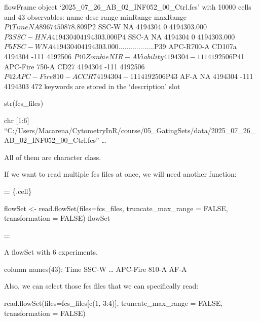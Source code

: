 \documentclass[
  letterpaper,
  DIV=11,
  numbers=noendperiod]{scrartcl}
\newenvironment{Shaded}{\begin{snugshade}}{\end{snugshade}}
\newcommand{\AttributeTok}[1]{\textcolor[rgb]{0.40,0.45,0.13}{#1}}
\newcommand{\ConstantTok}[1]{\textcolor[rgb]{0.56,0.35,0.01}{#1}}
\newcommand{\DecValTok}[1]{\textcolor[rgb]{0.68,0.00,0.00}{#1}}
\newcommand{\FunctionTok}[1]{\textcolor[rgb]{0.28,0.35,0.67}{#1}}
\newcommand{\NormalTok}[1]{\textcolor[rgb]{0.00,0.23,0.31}{#1}}
\newcommand{\OtherTok}[1]{\textcolor[rgb]{0.00,0.23,0.31}{#1}}
\newcommand{\SpecialCharTok}[1]{\textcolor[rgb]{0.37,0.37,0.37}{#1}}
\begin{document}
flowFrame object `2025\_07\_26\_AB\_02\_INF052\_00\_Ctrl.fcs' with 10000
cells and 43 observables: name desc range minRange maxRange
\(P1            Time        NA    896745         0     878.809\)P2 SSC-W
NA 4194304 0 4194303.000
\(P3           SSC-H        NA   4194304         0 4194303.000\)P4 SSC-A
NA 4194304 0 4194303.000
\(P5           FSC-W        NA   4194304         0 4194303.000
...             ...       ...       ...       ...         ...\)P39
APC-R700-A CD107a 4194304 -111 4192506
\(P40   Zombie NIR-A Viability   4194304      -111     4192506\)P41
APC-Fire 750-A CD27 4194304 -111 4192506
\(P42 APC-Fire 810-A      CCR7   4194304      -111     4192506\)P43 AF-A
NA 4194304 -111 4194303 472 keywords are stored in the `description'
slot

\begin{Shaded}
\begin{Highlighting}[]
\FunctionTok{str}\NormalTok{(fcs\_files)}
\end{Highlighting}
\end{Shaded}

chr {[}1:6{]}
``C:/Users/Macarena/CytometryInR/course/05\_GatingSets/data/2025\_07\_26\_AB\_02\_INF052\_00\_Ctrl.fcs''
\ldots{}

All of them are character class.

If we want to read multiple fcs files at once, we will need another
function:

::: \{.cell\}

\begin{Shaded}
\begin{Highlighting}[]
\NormalTok{flowSet }\OtherTok{\textless{}{-}} \FunctionTok{read.flowSet}\NormalTok{(}\AttributeTok{files=}\NormalTok{fcs\_files, }\AttributeTok{truncate\_max\_range =} \ConstantTok{FALSE}\NormalTok{, }\AttributeTok{transformation =} \ConstantTok{FALSE}\NormalTok{)}
\NormalTok{flowSet}
\end{Highlighting}
\end{Shaded}

:::

A flowSet with 6 experiments.

column names(43): Time SSC-W \ldots{} APC-Fire 810-A AF-A

Also, we can select those fcs files that we can specifically read:

\begin{Shaded}
\begin{Highlighting}[]
\FunctionTok{read.flowSet}\NormalTok{(}\AttributeTok{files=}\NormalTok{fcs\_files[}\FunctionTok{c}\NormalTok{(}\DecValTok{1}\NormalTok{, }\DecValTok{3}\SpecialCharTok{:}\DecValTok{4}\NormalTok{)], }\AttributeTok{truncate\_max\_range =} \ConstantTok{FALSE}\NormalTok{, }\AttributeTok{transformation =} \ConstantTok{FALSE}\NormalTok{)}
\end{Highlighting}
\end{Shaded}
\end{document}
